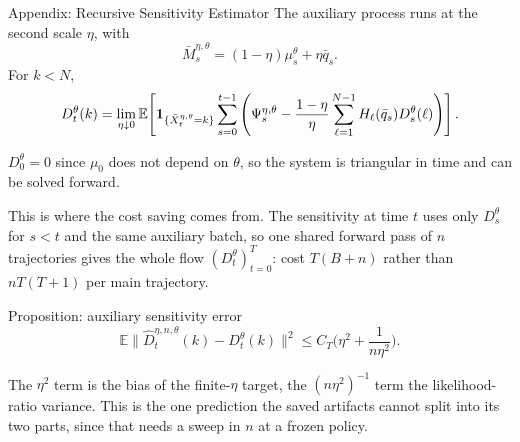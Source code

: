 \documentclass[9pt]{beamer}
\def\E{{\mathbb E}}
\def\b1{{\bf 1}}
\begin{document}
\begin{frame}{Appendix: Recursive Sensitivity Estimator}
\small
The auxiliary process runs at the second scale $\eta$, with
\[
  \bar M_s^{\eta,\theta}=(1-\eta)\mu_s^\theta+\eta\bar q_s .
\]
For $k<N$,
\[
  D_t^\theta(k)
  =
  \lim_{\eta\downarrow0}
  \E\!\left[
    \b1_{\{\bar X_t^{\eta,\theta}=k\}}
    \sum_{s=0}^{t-1}
    \left(
      \Psi_s^{\eta,\theta}
      -
      \frac{1-\eta}{\eta}
      \sum_{\ell=1}^{N-1}H_\ell(\bar q_s)D_s^\theta(\ell)
    \right)
  \right].
\]

\vspace{0.1cm}
$D_0^\theta=0$ since $\mu_0$ does not depend on $\theta$, so the system is triangular in time and can be solved forward.

\vspace{0.15cm}
This is where the cost saving comes from. The sensitivity at time $t$ uses only $D_s^\theta$ for $s<t$ and the same auxiliary batch, so one shared forward pass of $n$ trajectories gives the whole flow $(D_t^\theta)_{t=0}^T$: cost $T(B+n)$ rather than $nT(T+1)$ per main trajectory.

\vspace{0.15cm}
\begin{block}{Proposition: auxiliary sensitivity error}
\[
  \E\big\|\widehat D_t^{\eta,n,\theta}(k)-D_t^\theta(k)\big\|^2
  \leq
  C_T\Big(\eta^2+\frac{1}{n\eta^2}\Big).
\]
\end{block}
\scriptsize
The $\eta^2$ term is the bias of the finite-$\eta$ target, the $(n\eta^2)^{-1}$ term the likelihood-ratio variance. This is the one prediction the saved artifacts cannot split into its two parts, since that needs a sweep in $n$ at a frozen policy.
\end{frame}
\end{document}
